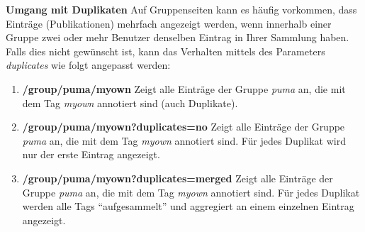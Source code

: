 \documentclass[b5paper,11pt,twoside]{scrbook} %
\begin{document}
\textbf{Umgang mit Duplikaten}\newline
Auf Gruppenseiten kann es häufig vorkommen, dass Einträge (Publikationen) mehrfach angezeigt werden, wenn innerhalb einer Gruppe zwei oder mehr Benutzer denselben Eintrag in Ihrer Sammlung haben.\newline
Falls dies nicht gewünscht ist, kann das Verhalten mittels des Parameters \textit{duplicates} wie folgt angepasst werden:
\begin{enumerate}
    \item \textbf{/group/puma/myown} \newline
    Zeigt alle Einträge der Gruppe \textit{puma} an, die mit dem Tag \textit{myown} annotiert sind (auch Duplikate).
    \item \textbf{/group/puma/myown?duplicates=no} \newline
    Zeigt alle Einträge der Gruppe \textit{puma} an, die mit dem Tag \textit{myown} annotiert sind. Für jedes Duplikat wird nur der erste Eintrag angezeigt.
    \item \textbf{/group/puma/myown?duplicates=merged} \newline
    Zeigt alle Einträge der Gruppe \textit{puma} an, die mit dem Tag \textit{myown} annotiert sind. Für jedes Duplikat werden alle Tags \enquote{aufgesammelt} und aggregiert an einem einzelnen Eintrag angezeigt.
\end{enumerate}
\end{document}
